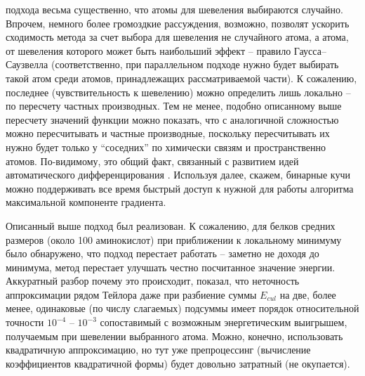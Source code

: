   подхода весьма существенно, что атомы для шевеления выбираются случайно. 
  Впрочем, немного более громоздкие рассуждения, возможно, позволят ускорить 
  сходимость метода за счет выбора для шевеления не случайного атома, а атома, 
  от шевеления которого может быть наибольший эффект -- правило 
  Гаусса--Саузвелла \cite{nutini2015coordinate} (соответственно, при параллельном подходе нужно будет 
  выбирать такой атом среди атомов, принадлежащих рассматриваемой части). К 
  сожалению, последнее (чувствительность к шевелению) можно определить лишь 
  локально -- по пересчету частных производных. Тем не менее, подобно 
  описанному выше пересчету значений функции можно показать, что с аналогичной 
  сложностью можно пересчитывать и частные производные, поскольку пересчитывать их 
  нужно будет только у ``соседних'' по химически связям и пространственно 
  атомов. По-видимому, это общий факт, связанный с развитием идей 
  автоматического дифференцирования \cite{nocedal2006sequential}. Используя далее, скажем, бинарные 
  кучи \cite{cormen2001introduction} можно поддерживать все время быстрый доступ к нужной для работы 
  алгоритма максимальной компоненте градиента.

  Описанный выше подход был реализован. К сожалению, для белков средних размеров (около 100 аминокислот) при приближении к локальному минимуму было обнаружено, что подход перестает работать -- заметно не доходя до минимума, метод перестает улучшать честно посчитанное значение энергии. Аккуратный разбор почему это происходит, показал, что неточность аппроксимации рядом Тейлора даже при разбиение суммы $ E_{cul}$ на две, более менее, одинаковые (по числу слагаемых) подсуммы имеет порядок относительной точности $10^{-4}$ -- $10^{-3}$ сопоставимый с возможным энергетическим выигрышем, получаемым при шевелении выбранного атома. Можно, конечно, использовать квадратичную аппроксимацию, но тут уже препроцессинг (вычисление коэффициентов квадратичной формы) будет довольно затратный (не окупается). 

